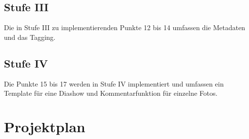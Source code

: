 \documentclass[a4paper,12pt,liststotocnumbered]{scrartcl}
\begin{document}
\subsection{Stufe III}

Die in Stufe III zu implementierenden Punkte 12 bis 14 umfassen die Metadaten
und das Tagging.

\subsection{Stufe IV}

Die Punkte 15 bis 17 werden in Stufe IV implementiert und umfassen ein
Template für eine Diashow und Kommentarfunktion für einzelne Fotos.

\section{Projektplan}
\end{document}
